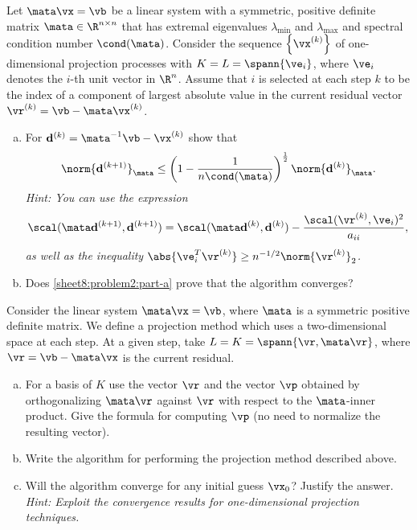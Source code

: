 \begin{Sheet}
  \begin{Problem}
    Let $\mata\vx = \vb$ be a linear system with a symmetric, positive
    definite matrix $\mata\in\R^{n\times n}$ that has extremal
    eigenvalues $\lambda_{\min}$ and $\lambda_{\max}$ and spectral
    condition number $\cond(\mata)$. Consider the sequence
    $\set{\vx^{(k)}}$ of one-dimensional projection processes with
    $K = L = \spann{\ve_i}$, where $\ve_i$ denotes the $i$-th unit
    vector in $\R^n$. Assume that $i$ is selected at each step $k$ to
    be the index of a component of largest absolute value in the
    current residual vector $\vr^{(k)} = \vb - \mata\vx^{(k)}$.
    \begin{enumerate}[(a)]
    \item\label{sheet8:problem2:part-a} For
      $\vd^{(k)} = \mata^{-1}\vb - \vx^{(k)}$ show that
      \begin{gather*}
        \norm{\vd^{(k+1)}}_\mata
        \leq
        \left(1-\frac1{n\cond(\mata)}\right)^{\frac12}
        \norm{\vd^{(k)}}_\mata.
      \end{gather*}
      \textit{Hint: You can use the expression
        \begin{gather*}
          \scal(\mata\vd^{(k+1)},\vd^{(k+1)})
          =\scal(\mata\vd^{(k)},\vd^{(k)})
          -\frac{\scal(\vr^{(k)},\ve_i)^2}{a_{ii}},
        \end{gather*}
        as well as the inequality
        $\abs{\ve_i^T \vr^{(k)}} \geq
        n^{-\nfrac12}\norm{\vr^{(k)}}_2$.}
    \item Does \eqref{sheet8:problem2:part-a} prove that the algorithm
      converges?
    \end{enumerate}
  \end{Problem}

  \begin{Problem}
    Consider the linear system $\mata\vx = \vb$, where $\mata$ is a
    symmetric positive definite matrix. We define a projection method
    which uses a two-dimensional space at each step. At a given step,
    take $L = K = \spann{\vr, \mata\vr}$, where $\vr = \vb - \mata\vx$
    is the current residual.
    \begin{enumerate}[(a)]
    \item For a basis of $K$ use the vector $\vr$ and the vector $\vp$
      obtained by orthogonalizing $\mata\vr$ against $\vr$ with
      respect to the $\mata$-inner product. Give the formula for
      computing $\vp$ (no need to normalize the resulting vector).
    \item Write the algorithm for performing the projection method
      described above.
    \item Will the algorithm converge for any initial guess $\vx_0$?
      Justify the answer. \textit{Hint: Exploit the convergence
        results for one-dimensional projection techniques.}
    \end{enumerate}
  \end{Problem}


\end{Sheet}
